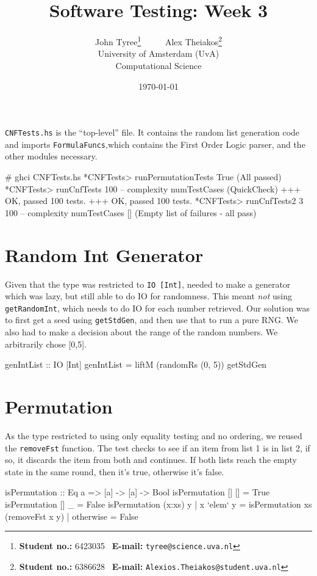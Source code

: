 \documentclass[a4paper,10pt]{article}
\title{Software Testing: Week 3}
\author{
John Tyree\footnote{\textbf{Student no.:} 6423035 \textbar\ \textbf{E-mail:} \texttt{tyree@science.uva.nl}} \ \ \ \ \ Alex Theiakos\footnote{\textbf{Student no.:}   6386628 \textbar\ \textbf{E-mail:} \texttt{Alexios.Theiakos@student.uva.nl}} \\[15pt] University of Amsterdam (UvA) \\ Computational Science}
\date{\today}
\numberwithin{equation}{section}%
\begin{document}
\maketitle

\texttt{CNFTests.hs} is the ``top-level'' file. It contains the random list generation code and imports \texttt{FormulaFuncs},which contains the First Order Logic parser, and the other modules necessary.

\begin{code}
# ghci CNFTests.hs
*CNFTests> runPermutationTests
True        (All passed)
*CNFTests> runCnfTests 100  -- complexity numTestCases (QuickCheck)
+++ OK, passed 100 tests.
+++ OK, passed 100 tests.
*CNFTests> runCnfTests2 3 100 -- complexity numTestCases
[]          (Empty list of failures - all pass)
\end{code}

\setcounter{section}{1}
\section{Random Int Generator}

Given that the type was restricted to \texttt{IO [Int]}, needed to make a generator which was lazy, but still able to do IO for randomness. This meant \emph{not} using \texttt{getRandomInt}, which needs to do IO for each number retrieved. Our solution was to first get a seed using \texttt{getStdGen}, and then use that to run a pure RNG. We also had to make a decision about the range of the random numbers. We arbitrarily chose [0,5].

\begin{code}
genIntList :: IO [Int]
genIntList = liftM (randomRs (0, 5)) getStdGen
\end{code}


\section{Permutation}

As the type restricted to using only equality testing and no ordering, we reused the \texttt{removeFst} function. The test checks to see if an item from list 1 is in list 2, if so, it discards the item from both and continues. If both lists reach the empty state in the same round, then it's true, otherwise it's false.

\begin{code}
isPermutation :: Eq a => [a] -> [a] -> Bool
isPermutation [] [] = True
isPermutation [] _  = False
isPermutation (x:xs) y
    | x `elem` y = isPermutation xs (removeFst x y)
    | otherwise  = False
\end{code}
\end{document}
